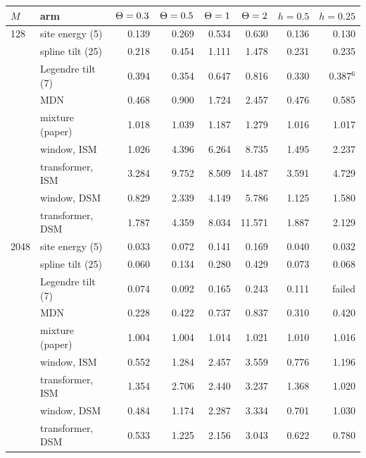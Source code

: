 \begin{tabular}{@{}l l r r r r r r@{}}
\toprule
$M$ & arm & $\Theta=0.3$ & $\Theta=0.5$ & $\Theta=1$ & $\Theta=2$ & $h=0.5$ & $h=0.25$ \\
\midrule
128 & site energy (5) & 0.139 & 0.269 & 0.534 & 0.630 & 0.136 & 0.130 \\
 & spline tilt (25) & 0.218 & 0.454 & 1.111 & 1.478 & 0.231 & 0.235 \\
 & Legendre tilt (7) & 0.394 & 0.354 & 0.647 & 0.816 & 0.330 & 0.387$^{6}$ \\
 & MDN & 0.468 & 0.900 & 1.724 & 2.457 & 0.476 & 0.585 \\
 & mixture (paper) & 1.018 & 1.039 & 1.187 & 1.279 & 1.016 & 1.017 \\
 & window, ISM & 1.026 & 4.396 & 6.264 & 8.735 & 1.495 & 2.237 \\
 & transformer, ISM & 3.284 & 9.752 & 8.509 & 14.487 & 3.591 & 4.729 \\
 & window, DSM & 0.829 & 2.339 & 4.149 & 5.786 & 1.125 & 1.580 \\
 & transformer, DSM & 1.787 & 4.359 & 8.034 & 11.571 & 1.887 & 2.129 \\
\midrule
2048 & site energy (5) & 0.033 & 0.072 & 0.141 & 0.169 & 0.040 & 0.032 \\
 & spline tilt (25) & 0.060 & 0.134 & 0.280 & 0.429 & 0.073 & 0.068 \\
 & Legendre tilt (7) & 0.074 & 0.092 & 0.165 & 0.243 & 0.111 & failed \\
 & MDN & 0.228 & 0.422 & 0.737 & 0.837 & 0.310 & 0.420 \\
 & mixture (paper) & 1.004 & 1.004 & 1.014 & 1.021 & 1.010 & 1.016 \\
 & window, ISM & 0.552 & 1.284 & 2.457 & 3.559 & 0.776 & 1.196 \\
 & transformer, ISM & 1.354 & 2.706 & 2.440 & 3.237 & 1.368 & 1.020 \\
 & window, DSM & 0.484 & 1.174 & 2.287 & 3.334 & 0.701 & 1.030 \\
 & transformer, DSM & 0.533 & 1.225 & 2.156 & 3.043 & 0.622 & 0.780 \\
\bottomrule
\end{tabular}
